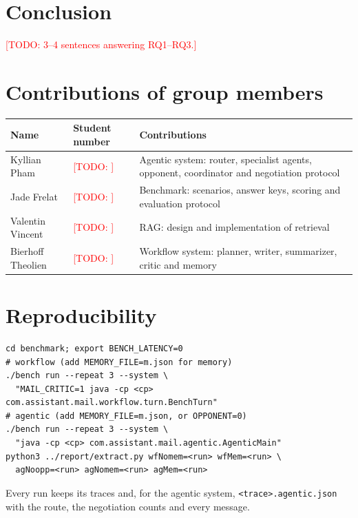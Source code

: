 \documentclass[11pt,a4paper]{article}
\newcommand{\code}[1]{\texttt{#1}}
\newcommand{\todo}[1]{\textcolor{red}{[TODO: #1]}}
\begin{document}
\section{Conclusion}
\todo{3--4 sentences answering RQ1--RQ3.}

\section*{Contributions of group members}
\begin{center}
\begin{tabularx}{\linewidth}{llX}
\toprule
Name & Student number & Contributions \\
\midrule
Kyllian Pham & \todo{} & Agentic system: router, specialist agents, opponent, coordinator and negotiation protocol \\
Jade Frelat & \todo{} & Benchmark: scenarios, answer keys, scoring and evaluation protocol \\
Valentin Vincent & \todo{} & RAG: design and implementation of retrieval \\
Bierhoff Theolien & \todo{} & Workflow system: planner, writer, summarizer, critic and memory \\
\bottomrule
\end{tabularx}
\end{center}

\section*{Reproducibility}
\begin{verbatim}
cd benchmark; export BENCH_LATENCY=0
# workflow (add MEMORY_FILE=m.json for memory)
./bench run --repeat 3 --system \
  "MAIL_CRITIC=1 java -cp <cp> com.assistant.mail.workflow.turn.BenchTurn"
# agentic (add MEMORY_FILE=m.json, or OPPONENT=0)
./bench run --repeat 3 --system \
  "java -cp <cp> com.assistant.mail.agentic.AgenticMain"
python3 ../report/extract.py wfNomem=<run> wfMem=<run> \
  agNoopp=<run> agNomem=<run> agMem=<run>
\end{verbatim}
Every run keeps its traces and, for the agentic system, \code{<trace>.agentic.json} with the route, the
negotiation counts and every message.
\end{document}
